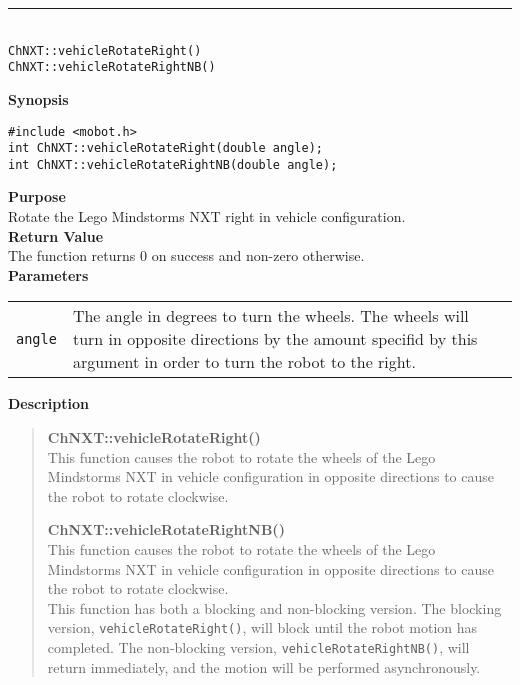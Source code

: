 \noindent
\vspace{5pt}
\rule{4.5in}{0.015in}\\
\noindent
{\LARGE \texttt{ChNXT::vehicleRotateRight()}}\\
{\LARGE \texttt{ChNXT::vehicleRotateRightNB()}}\\
{}

\noindent
{\bf Synopsis}
\vspace{-8pt}
\begin{verbatim}
#include <mobot.h>
int ChNXT::vehicleRotateRight(double angle);
int ChNXT::vehicleRotateRightNB(double angle);
\end{verbatim}

\noindent
{\bf Purpose}\\
Rotate the Lego Mindstorms NXT right in vehicle configuration.\\

\noindent
{\bf Return Value}\\
The function returns 0 on success and non-zero otherwise.\\

\noindent
{\bf Parameters}\\
\vspace{-0.1in}
\begin{description}
\item               
\begin{tabular}{p{10 mm}p{145 mm}}
\texttt{angle} & The angle in degrees to turn the wheels. The wheels will turn in opposite directions by the amount specifid by this argument in order to turn the robot to the right. \\
\end{tabular}
\end{description}

\noindent
{\bf Description}\\
\vspace{-12pt}
\begin{quote}
{\bf ChNXT::vehicleRotateRight()}\\
This function causes the robot to rotate the wheels of the Lego Mindstorms NXT in vehicle configuration in opposite directions to cause the robot to rotate clockwise.

{\bf ChNXT::vehicleRotateRightNB()}\\
This function causes the robot to rotate the wheels of the Lego Mindstorms NXT in vehicle configuration in opposite directions to cause the robot to rotate clockwise.\\
\newline
This function has both a blocking and non-blocking version.
The blocking version, \texttt{vehicleRotateRight()}, will block until the
robot motion has completed. The non-blocking version, \texttt{vehicleRotateRightNB()},
will return immediately, and the motion will be performed asynchronously.\\
\end{quote}

